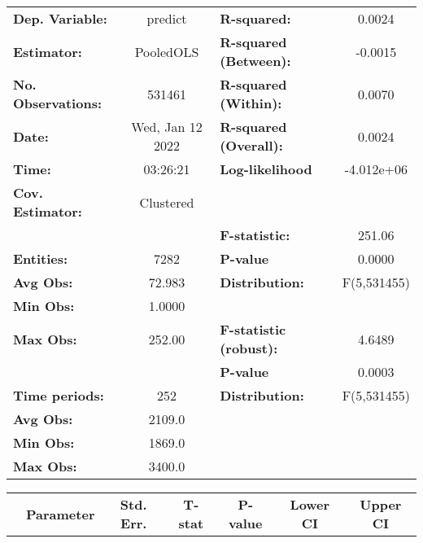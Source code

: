 \begin{center}
\begin{tabular}{lclc}
\toprule
\textbf{Dep. Variable:}    &      predict       & \textbf{  R-squared:         }   &      0.0024      \\
\textbf{Estimator:}        &     PooledOLS      & \textbf{  R-squared (Between):}  &     -0.0015      \\
\textbf{No. Observations:} &       531461       & \textbf{  R-squared (Within):}   &      0.0070      \\
\textbf{Date:}             &  Wed, Jan 12 2022  & \textbf{  R-squared (Overall):}  &      0.0024      \\
\textbf{Time:}             &      03:26:21      & \textbf{  Log-likelihood     }   &    -4.012e+06    \\
\textbf{Cov. Estimator:}   &     Clustered      & \textbf{                     }   &                  \\
\textbf{}                  &                    & \textbf{  F-statistic:       }   &      251.06      \\
\textbf{Entities:}         &        7282        & \textbf{  P-value            }   &      0.0000      \\
\textbf{Avg Obs:}          &       72.983       & \textbf{  Distribution:      }   &   F(5,531455)    \\
\textbf{Min Obs:}          &       1.0000       & \textbf{                     }   &                  \\
\textbf{Max Obs:}          &       252.00       & \textbf{  F-statistic (robust):} &      4.6489      \\
\textbf{}                  &                    & \textbf{  P-value            }   &      0.0003      \\
\textbf{Time periods:}     &        252         & \textbf{  Distribution:      }   &   F(5,531455)    \\
\textbf{Avg Obs:}          &       2109.0       & \textbf{                     }   &                  \\
\textbf{Min Obs:}          &       1869.0       & \textbf{                     }   &                  \\
\textbf{Max Obs:}          &       3400.0       & \textbf{                     }   &                  \\
\bottomrule
\end{tabular}
\begin{tabular}{lcccccc}
                & \textbf{Parameter} & \textbf{Std. Err.} & \textbf{T-stat} & \textbf{P-value} & \textbf{Lower CI} & \textbf{Upper CI}  \\

\end{tabular}
\end{center}
